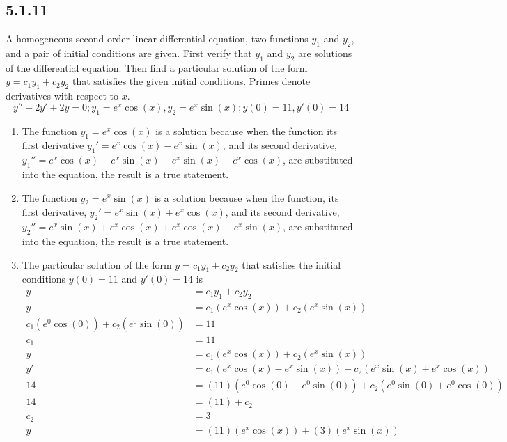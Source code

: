 \documentclass{article}
\begin{document}
\subsection{5.1.11}
A homogeneous second-order linear differential equation, two functions $ y_1 $ and $ y_2 $, and a pair of initial conditions are given. First verify that $ y_1 $ and $ y_2 $ are solutions of the differential equation. Then find a particular solution of the form $ y = c_1y_1 + c_2y_2 $ that satisfies the given initial conditions. Primes denote derivatives with respect to $ x $.
$$ y'' - 2y' + 2y = 0; y_1 = e^x\cos(x), y_2 = e^x\sin(x); y(0) = 11, y'(0) = 14 $$
\begin{enumerate}[label=\textbf{(\alph*)}]
	\item The function $ y_1 = e^x\cos(x) $ is a solution because when the function its first derivative $ y_1' = e^x\cos(x) - e^x\sin(x) $, and its second derivative, $ y_1'' = e^x\cos(x) - e^x\sin(x) - e^x\sin(x) - e^x\cos(x) $, are substituted into the equation, the result is a true statement.
	\item The function $ y_2 = e^x\sin(x) $ is a solution because when the function, its first derivative, $ y_2' = e^x\sin(x) + e^x\cos(x) $, and its second derivative, $ y_2'' = e^x\sin(x) + e^x\cos(x) + e^x\cos(x) - e^x\sin(x) $, are substituted into the equation, the result is a true statement.
	\item The particular solution of the form $ y = c_1y_1 + c_2y_2 $ that satisfies the initial conditions $ y(0) = 11 $ and $ y'(0) = 14 $ is
		\begin{align*}
			y & = c_1y_1 + c_2y_2 \\
			y & = c_1 \left( e^x\cos(x) \right) + c_2 \left( e^x\sin(x) \right) \\
			c_1 \left( e^0\cos(0) \right) + c_2 \left( e^0\sin(0) \right) & = 11 \\
			c_1 & = 11 \\
			y & = c_1 \left( e^x\cos(x) \right) + c_2 \left( e^x\sin(x) \right) \\
			y' & = c_1 \left( e^x\cos(x) - e^x\sin(x) \right) + c_2 \left( e^x\sin(x) + e^x\cos(x) \right) \\
			14 & = (11) \left( e^0\cos(0) - e^0\sin(0) \right) + c_2 \left( e^0\sin(0) + e^0\cos(0) \right) \\
			14 & = (11) + c_2 \\
			c_2 & = 3 \\
			y & = (11)(e^x\cos(x)) + (3)(e^x\sin(x))
		\end{align*}
\end{enumerate}
\end{document}
